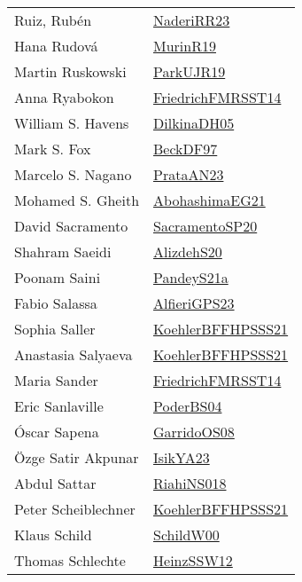{\begin{longtable}{p{4cm}p{20cm}}
Ruiz, Rub\'{e}n & \href{articles/NaderiRR23.pdf}{NaderiRR23}\cite{NaderiRR23} \\
Hana Rudov{\'{a}} & \href{papers/MurinR19.pdf}{MurinR19}\cite{MurinR19} \\
Martin Ruskowski & \href{papers/ParkUJR19.pdf}{ParkUJR19}\cite{ParkUJR19} \\
Anna Ryabokon & \href{}{FriedrichFMRSST14}\cite{FriedrichFMRSST14} \\
William S. Havens & \href{papers/DilkinaDH05.pdf}{DilkinaDH05}\cite{DilkinaDH05} \\
Mark S. Fox & \href{papers/BeckDF97.pdf}{BeckDF97}\cite{BeckDF97} \\
Marcelo S. Nagano & \href{articles/PrataAN23.pdf}{PrataAN23}\cite{PrataAN23} \\
Mohamed S. Gheith & \href{articles/AbohashimaEG21.pdf}{AbohashimaEG21}\cite{AbohashimaEG21} \\
David Sacramento & \href{articles/SacramentoSP20.pdf}{SacramentoSP20}\cite{SacramentoSP20} \\
Shahram Saeidi & \href{}{AlizdehS20}\cite{AlizdehS20} \\
Poonam Saini & \href{articles/PandeyS21a.pdf}{PandeyS21a}\cite{PandeyS21a} \\
Fabio Salassa & \href{articles/AlfieriGPS23.pdf}{AlfieriGPS23}\cite{AlfieriGPS23} \\
Sophia Saller & \href{articles/KoehlerBFFHPSSS21.pdf}{KoehlerBFFHPSSS21}\cite{KoehlerBFFHPSSS21} \\
Anastasia Salyaeva & \href{articles/KoehlerBFFHPSSS21.pdf}{KoehlerBFFHPSSS21}\cite{KoehlerBFFHPSSS21} \\
Maria Sander & \href{}{FriedrichFMRSST14}\cite{FriedrichFMRSST14} \\
Eric Sanlaville & \href{articles/PoderBS04.pdf}{PoderBS04}\cite{PoderBS04} \\
{\'{O}}scar Sapena & \href{articles/GarridoOS08.pdf}{GarridoOS08}\cite{GarridoOS08} \\
{\"{O}}zge Satir Akpunar & \href{articles/IsikYA23.pdf}{IsikYA23}\cite{IsikYA23} \\
Abdul Sattar & \href{papers/RiahiNS018.pdf}{RiahiNS018}\cite{RiahiNS018} \\
Peter Scheiblechner & \href{articles/KoehlerBFFHPSSS21.pdf}{KoehlerBFFHPSSS21}\cite{KoehlerBFFHPSSS21} \\
Klaus Schild & \href{articles/SchildW00.pdf}{SchildW00}\cite{SchildW00} \\
Thomas Schlechte & \href{articles/HeinzSSW12.pdf}{HeinzSSW12}\cite{HeinzSSW12} \\

\end{longtable}}
